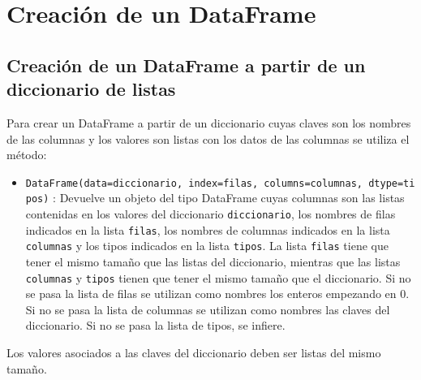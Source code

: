 \documentclass[
  spanish,
  a4paper,
]{scrreport}
\providecommand{\tightlist}{%
  \setlength{\itemsep}{0pt}\setlength{\parskip}{0pt}}
\begin{document}
\section{Creación de un DataFrame}\label{creaciuxf3n-de-un-dataframe}

\subsection{Creación de un DataFrame a partir de un diccionario de
listas}\label{creaciuxf3n-de-un-dataframe-a-partir-de-un-diccionario-de-listas}

Para crear un DataFrame a partir de un diccionario cuyas claves son los
nombres de las columnas y los valores son listas con los datos de las
columnas se utiliza el método:

\begin{itemize}
\tightlist
\item
  \texttt{DataFrame(data=diccionario,\ index=filas,\ columns=columnas,\ dtype=tipos)}
  : Devuelve un objeto del tipo DataFrame cuyas columnas son las listas
  contenidas en los valores del diccionario \texttt{diccionario}, los
  nombres de filas indicados en la lista \texttt{filas}, los nombres de
  columnas indicados en la lista \texttt{columnas} y los tipos indicados
  en la lista \texttt{tipos}. La lista \texttt{filas} tiene que tener el
  mismo tamaño que las listas del diccionario, mientras que las listas
  \texttt{columnas} y \texttt{tipos} tienen que tener el mismo tamaño
  que el diccionario. Si no se pasa la lista de filas se utilizan como
  nombres los enteros empezando en 0. Si no se pasa la lista de columnas
  se utilizan como nombres las claves del diccionario. Si no se pasa la
  lista de tipos, se infiere.
\end{itemize}

\begin{tcolorbox}[enhanced jigsaw, arc=.35mm, bottomrule=.15mm, bottomtitle=1mm, breakable, colback=white, colbacktitle=quarto-callout-warning-color!10!white, colframe=quarto-callout-warning-color-frame, coltitle=black, left=2mm, leftrule=.75mm, opacityback=0, opacitybacktitle=0.6, rightrule=.15mm, title=\textcolor{quarto-callout-warning-color}{\faExclamationTriangle}\hspace{0.5em}{Advertencia}, titlerule=0mm, toprule=.15mm, toptitle=1mm]

Los valores asociados a las claves del diccionario deben ser listas del
mismo tamaño.

\end{tcolorbox}
\end{document}
